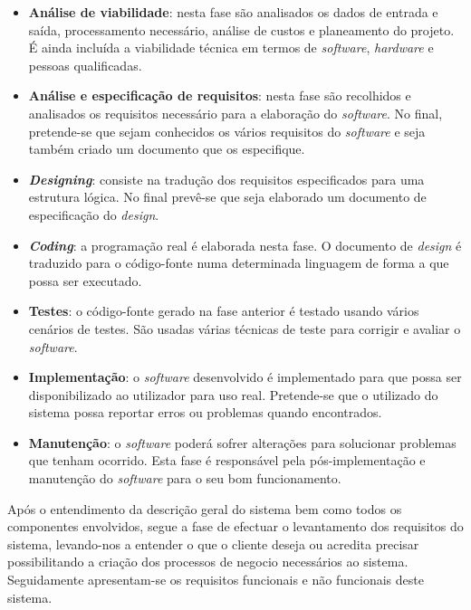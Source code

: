 \begin{itemize}
	\item \textbf{Análise de viabilidade}: nesta fase são analisados os dados de entrada e saída, processamento necessário, análise de custos e planeamento do projeto. É ainda incluída a viabilidade técnica em termos de \textit{software}, \textit{hardware} e pessoas qualificadas. 
	
	\item \textbf{Análise e especificação de requisitos}: nesta fase são recolhidos e analisados os requisitos necessário para a elaboração do \textit{software}. No final, pretende-se que sejam conhecidos os vários requisitos do \textit{software} e seja também criado um documento que os especifique. 
	
	\item  \textbf{\textit{Designing}}: consiste na tradução dos requisitos especificados para uma estrutura lógica. No final prevê-se que seja elaborado um documento de especificação do \textit{design}. 
	
	
	\item  \textbf{\textit{Coding}}: a programação real é elaborada nesta fase. O documento de \textit{design} é traduzido para o código-fonte numa determinada linguagem de forma a que possa ser executado. 
	
	\item \textbf{Testes}: o código-fonte gerado na fase anterior é testado usando vários cenários de testes. São usadas várias técnicas de teste para corrigir e avaliar o \textit{software}. 
	
	\item  \textbf{Implementação}: o \textit{software} desenvolvido é implementado para que possa ser disponibilizado ao utilizador para uso real. Pretende-se que o utilizado do sistema possa reportar erros ou problemas quando encontrados. 
	
	\item  \textbf{Manutenção}: o \textit{software} poderá sofrer alterações para solucionar problemas que tenham ocorrido. Esta fase é responsável pela pós-implementação e manutenção do \textit{software} para o seu bom funcionamento.
	
\end{itemize}


Após o entendimento da descrição geral do sistema bem como todos os componentes envolvidos, segue a fase de efectuar o levantamento dos requisitos do sistema, levando-nos a entender o que o cliente deseja ou acredita precisar possibilitando a criação dos processos de negocio necessários ao sistema. Seguidamente apresentam-se os requisitos funcionais e não funcionais deste sistema. 


